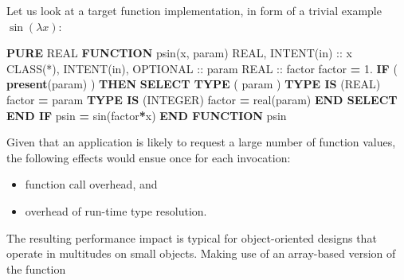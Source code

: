 \documentclass[
  paper=a4,
  ,captions=tableheading
]{scrartcl}
\newenvironment{Shaded}{\begin{snugshade}}{\end{snugshade}}
\newcommand{\BuiltInTok}[1]{#1}
\newcommand{\DataTypeTok}[1]{\textcolor[rgb]{0.13,0.29,0.53}{#1}}
\newcommand{\FloatTok}[1]{\textcolor[rgb]{0.00,0.00,0.81}{#1}}
\newcommand{\FunctionTok}[1]{\textcolor[rgb]{0.13,0.29,0.53}{\textbf{#1}}}
\newcommand{\KeywordTok}[1]{\textcolor[rgb]{0.13,0.29,0.53}{\textbf{#1}}}
\newcommand{\NormalTok}[1]{#1}
\providecommand{\tightlist}{%
  \setlength{\itemsep}{0pt}\setlength{\parskip}{0pt}}
\begin{document}
Let us look at a target function implementation, in form of a trivial
example \(\sin(\lambda x)\):

\begin{Shaded}
\begin{Highlighting}[]
\KeywordTok{PURE} \DataTypeTok{REAL} \KeywordTok{FUNCTION}\NormalTok{ psin(x, param)}
   \DataTypeTok{REAL}\NormalTok{, }\DataTypeTok{INTENT(in)} \DataTypeTok{::}\NormalTok{ x}
   \DataTypeTok{CLASS(*)}\NormalTok{, }\DataTypeTok{INTENT(in)}\NormalTok{, }\DataTypeTok{OPTIONAL} \DataTypeTok{::}\NormalTok{ param}
   \DataTypeTok{REAL} \DataTypeTok{::}\NormalTok{ factor}
\NormalTok{   factor }\KeywordTok{=} \FloatTok{1.}
   \KeywordTok{IF}\NormalTok{ ( }\FunctionTok{present}\NormalTok{(param) ) }\KeywordTok{THEN}
      \KeywordTok{SELECT TYPE}\NormalTok{ ( param )}
      \KeywordTok{TYPE IS}\NormalTok{ (}\DataTypeTok{REAL}\NormalTok{)}
\NormalTok{         factor }\KeywordTok{=}\NormalTok{ param}
      \KeywordTok{TYPE IS}\NormalTok{ (}\DataTypeTok{INTEGER}\NormalTok{)}
\NormalTok{         factor }\KeywordTok{=} \DataTypeTok{real(param)}
      \KeywordTok{END SELECT}
   \KeywordTok{END IF}
\NormalTok{   psin }\KeywordTok{=} \BuiltInTok{sin}\NormalTok{(factor}\KeywordTok{*}\NormalTok{x)}
\KeywordTok{END FUNCTION}\NormalTok{ psin}
\end{Highlighting}
\end{Shaded}

Given that an application is likely to request a large number of
function values, the following effects would ensue once for each
invocation:

\begin{itemize}
\tightlist
\item
  function call overhead, and
\item
  overhead of run-time type resolution.
\end{itemize}

The resulting performance impact is typical for object-oriented designs
that operate in multitudes on small objects. Making use of an
array-based version of the function
\end{document}
